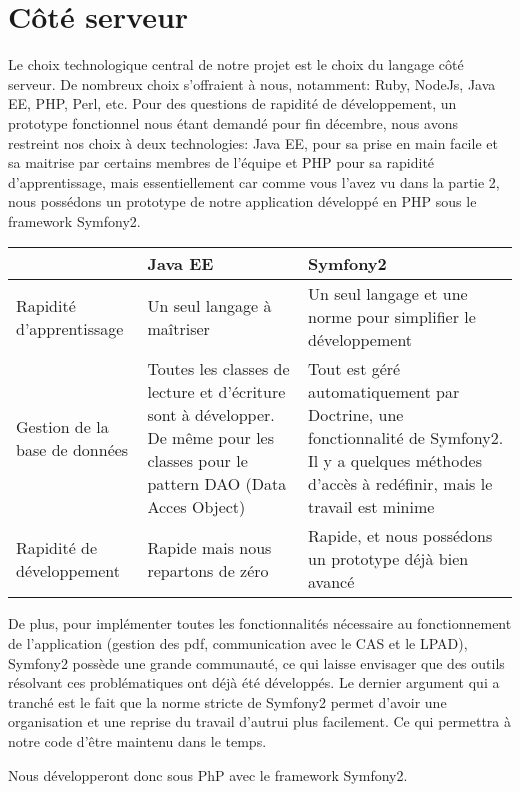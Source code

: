 \section{Côté serveur}
Le choix technologique central de notre projet est le choix du langage côté serveur. De nombreux choix s'offraient à nous, notamment: Ruby, NodeJs, Java EE, PHP, Perl, etc.
Pour des questions de rapidité de développement, un prototype fonctionnel nous étant demandé pour fin décembre, nous avons restreint nos choix à deux technologies: Java EE, pour sa prise en main facile et sa maitrise par certains membres de l'équipe et PHP pour sa rapidité d'apprentissage, mais essentiellement car comme vous l'avez vu dans la partie 2, nous possédons un prototype de notre application développé en PHP sous le framework Symfony2.



\begin{tabular}{|m{125pt}|m{150pt}|m{150pt}|}
	\hline
	\null & \textbf{Java EE} & \textbf{Symfony2} \\
	\hline
	Rapidité d'apprentissage & Un  seul langage à maîtriser & Un seul langage et une norme pour simplifier le développement\\
	\hline
	Gestion de la base de données & Toutes les classes de lecture et d'écriture sont à développer. De même pour les classes pour le pattern DAO (Data Acces Object) & Tout est géré automatiquement par Doctrine, une fonctionnalité de Symfony2. Il y a quelques méthodes d'accès à redéfinir, mais le travail est minime\\
	\hline
	Rapidité de développement & Rapide mais nous repartons de zéro & Rapide, et nous possédons un prototype déjà bien avancé\\
	\hline
\end{tabular}
%                       
% 
%
%
%
%  
%
%

De plus, pour implémenter toutes les fonctionnalités nécessaire au fonctionnement de l'application (gestion des pdf, communication avec le CAS et le LPAD), Symfony2 possède une grande communauté, ce qui laisse envisager que des outils résolvant ces problématiques ont déjà été développés.
Le dernier argument qui a tranché est le fait que la norme stricte de Symfony2 permet d'avoir une organisation et une reprise du travail d'autrui plus facilement. Ce qui permettra à notre code d'être maintenu dans le temps.

Nous développeront donc sous PhP avec le framework Symfony2.